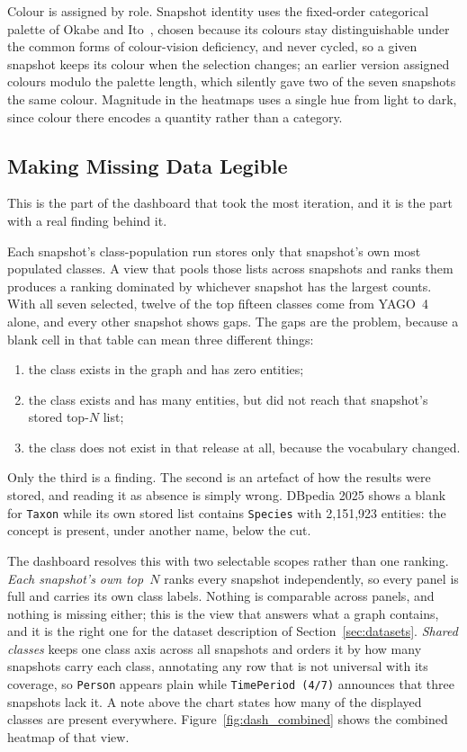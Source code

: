Colour is assigned by role. Snapshot identity uses the fixed-order categorical
palette of Okabe and Ito~\cite{okabe2008cud}, chosen because its colours stay
distinguishable under the common forms of colour-vision deficiency, and never
cycled, so a given snapshot keeps its colour when the selection
changes; an earlier version assigned colours modulo the palette length, which
silently gave two of the seven snapshots the same colour. Magnitude in the
heatmaps uses a single hue from light to dark, since colour there encodes a
quantity rather than a category.

\subsection{Making Missing Data Legible}
\label{subsec:dash_missing}

This is the part of the dashboard that took the most iteration, and it is the
part with a real finding behind it.

Each snapshot's class-population run stores only that snapshot's own most
populated classes. A view that pools those lists across snapshots and ranks them
produces a ranking dominated by whichever snapshot has the largest counts. With
all seven selected, twelve of the top fifteen classes come from YAGO~4 alone, and
every other snapshot shows gaps. The gaps are the problem, because a blank cell
in that table can mean three different things:

\begin{enumerate}
  \item the class exists in the graph and has zero entities;
  \item the class exists and has many entities, but did not reach that
        snapshot's stored top-$N$ list;
  \item the class does not exist in that release at all, because the vocabulary
        changed.
\end{enumerate}

Only the third is a finding. The second is an artefact of how the results were
stored, and reading it as absence is simply wrong. DBpedia 2025 shows a blank for
\texttt{Taxon} while its own stored list contains \texttt{Species} with
2{,}151{,}923 entities: the concept is present, under another name, below the
cut.

The dashboard resolves this with two selectable scopes rather than one ranking.
\emph{Each snapshot's own top~$N$} ranks every snapshot independently, so every
panel is full and carries its own class labels. Nothing is comparable across
panels, and nothing is missing either; this is the view that answers what a graph
contains, and it is the right one for the dataset description of
Section~\ref{sec:datasets}. \emph{Shared classes} keeps one class axis across all
snapshots and orders it by how many snapshots carry each class, annotating any
row that is not universal with its coverage, so \texttt{Person} appears plain
while \texttt{TimePeriod (4/7)} announces that three snapshots lack it. A note
above the chart states how many of the displayed classes are present everywhere.
Figure~\ref{fig:dash_combined} shows the combined heatmap of that view.

